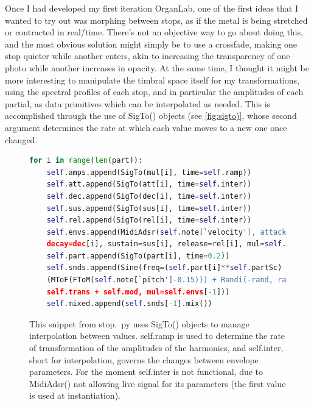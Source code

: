 \documentclass[12pt,twoside,maitrise]{dms_ks}
\theoremstyle{definition}
\begin{document}
{Once I had developed my first iteration OrganLab, one of the first ideas that I wanted to try out was morphing between stops, as if the metal is being stretched or contracted in real\=/time.
There's not an objective way to go about doing this, and the most obvious solution might simply be to use a crossfade, making one stop quieter while another enters, akin to increasing the transparency of one photo while another increases in opacity.
At the same time, I thought it might be more interesting to manipulate the timbral space itself for my transformations, using the spectral profiles of each stop, and in particular the amplitudes of each partial, as data primitives which can be interpolated as needed.
This is accomplished through the use of SigTo() objects (see \cref{fig:sigto)}, whose second argument determines the rate at which each value moves to a new one once changed.

\begin{figure}[H]
\begin{lstlisting}[language=Python]
for i in range(len(part)):
    self.amps.append(SigTo(mul[i], time=self.ramp))
    self.att.append(SigTo(att[i], time=self.inter))
    self.dec.append(SigTo(dec[i], time=self.inter))
    self.sus.append(SigTo(sus[i], time=self.inter))
    self.rel.append(SigTo(rel[i], time=self.inter))
    self.envs.append(MidiAdsr(self.note[`velocity'], attack=att[i],
    decay=dec[i], sustain=sus[i], release=rel[i], mul=self.amps[-1]))
    self.part.append(SigTo(part[i], time=0.2))
    self.snds.append(Sine(freq=(self.part[i]**self.partSc) * 
    (MToF(FToM(self.note[`pitch']-0.15))) + Randi(-rand, rand, 5) + 
    self.trans + self.mod, mul=self.envs[-1]))
    self.mixed.append(self.snds[-1].mix())
\end{lstlisting}
\caption{This snippet from stop.~py uses SigTo() objects to manage interpolation between values. self.ramp is used to determine the rate of transformation of the amplitudes of the harmonics, and self.inter, short for interpolation, governs the changes between envelope parameters. For the moment self.inter is not functional, due to MidiAdsr() not allowing live signal for its parameters (the first value is used at instantiation).} 
\label{fig:sigto}
\end{figure}

}
\end{document}
